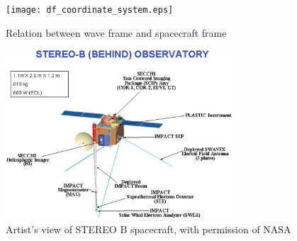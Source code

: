 \documentclass[galley,ras]{agu2001}
\begin{document}
\begin{article}
%
%
%

%
%
%
%
%

\begin{figure}
 \noindent\texttt{[image: df\_coordinate\_system.eps]}
 \caption{Relation between wave frame and spacecraft frame}\label{fig_coord_frame}
 \end{figure}


\begin{figure}
\noindent\includegraphics[width=20pc]{instruments.eps}
  \caption{Artist's view of STEREO B spacecraft, with permission of NASA}\label{fig_stereo}
  \end{figure}



\end{article}
\end{document}
